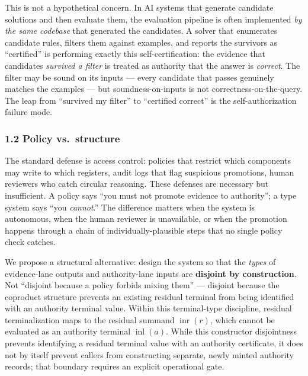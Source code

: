 \documentclass[
  10pt,
]{article}
\begin{document}
This is not a hypothetical concern. In AI systems that generate candidate solutions and then evaluate them, the evaluation pipeline is often implemented \emph{by the same codebase} that generated the candidates. A solver that enumerates candidate rules, filters them against examples, and reports the survivors as ``certified'' is performing exactly this self-certification: the evidence that candidates \emph{survived a filter} is treated as authority that the answer is \emph{correct}. The filter may be sound on its inputs --- every candidate that passes genuinely matches the examples --- but soundness-on-inputs is not correctness-on-the-query. The leap from ``survived my filter'' to ``certified correct'' is the self-authorization failure mode.

\subsubsection{1.2 Policy vs.~structure}\label{policy-vs.-structure}

The standard defense is access control: policies that restrict which components may write to which registers, audit logs that flag suspicious promotions, human reviewers who catch circular reasoning. These defenses are necessary but insufficient. A policy says ``you must not promote evidence to authority''; a type system says ``you \emph{cannot}.'' The difference matters when the system is autonomous, when the human reviewer is unavailable, or when the promotion happens through a chain of individually-plausible steps that no single policy check catches.

We propose a structural alternative: design the system so that the \emph{types} of evidence-lane outputs and authority-lane inputs are \textbf{disjoint by construction}. Not ``disjoint because a policy forbids mixing them'' --- disjoint because the coproduct structure prevents an existing residual terminal from being identified with an authority terminal value. Within this terminal-type discipline, residual terminalization maps to the residual summand \protect\hypertarget{math-E0004-0004}{}{\(\operatorname{inr}(r)\)}, which cannot be evaluated as an authority terminal \protect\hypertarget{math-E0005-0005}{}{\(\operatorname{inl}(a)\)}. While this constructor disjointness prevents identifying a residual terminal value with an authority certificate, it does not by itself prevent callers from constructing separate, newly minted authority records; that boundary requires an explicit operational gate.
\end{document}
